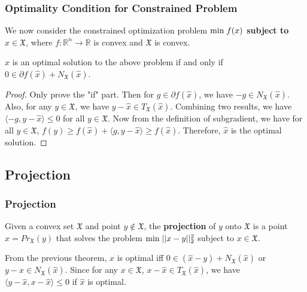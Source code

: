 \begin{frame}\frametitle{Optimality Condition for Constrained Problem}
    \hspace{2mm}We now consider the constrained optimization problem \textbf{$\text{min} \hspace{1mm} f(x)$ subject to $x \in \mathfrak{X}$}, where $f: \mathbb{R}^n \rightarrow \mathbb{R}$ is convex and $\mathfrak{X}$ is convex.\\
    \vspace{3mm}
    \begin{theorem}
        $\hat{x}$ is an optimal solution to the above problem if and only if $0 \in \partial f(\hat{x}) + N_\mathfrak{X}(\hat{x}) $.
    \end{theorem}
    \begin{proof}
        Only prove the "if" part. Then for $g \in \partial f(\hat{x})$, we have $-g \in N_{\mathfrak{X}} (\hat{x})$. 
        Also, for any $y \in \mathfrak{X}$, we have $y-\hat{x} \in T_\mathfrak{X} (\hat{x})$.
        Combining two results, we have $\langle -g, y- \hat{x} \rangle \leq 0$ for all $y \in \mathfrak{X}$.
        Now from the definition of subgradient, we have for all $y \in \mathfrak{X}$, $f(y) \geq f(\hat{x}) + \langle g, y - \hat{x} \rangle \geq f(\hat{x})$.
        Therefore, $\hat{x}$ is the optimal solution.
    \end{proof}
\end{frame}

\subsection{Projection}
\begin{frame}\frametitle{Projection}
    \begin{definition}
        Given a convex set $\mathfrak{X}$ and point $y \notin \mathfrak{X}$, the \textbf{projection} of $y$ onto $\mathfrak{X}$ is a point $\hat{x} = Pr_\mathfrak{X} (y)$ that solves the problem $\text{min} \hspace{1mm} ||x-y||_2^2$ subject to $x \in \mathfrak{X}$.
    \end{definition}
    From the previous theorem, $\hat{x}$ is optimal iff $0 \in (\hat{x} - y) + N_\mathfrak{X} (\hat{x})$ or $y-\hat{x} \in N_\mathfrak{X} (\hat{x})$. 
    Since for any $x \in \mathfrak{X}$, $x-\hat{x} \in T_\mathfrak{X} (\hat{x})$, we have $\langle y-\hat{x}, x-\hat{x} \rangle \leq 0$ if $\hat{x}$ is optimal.\\
\end{frame}

